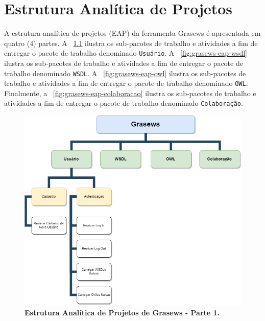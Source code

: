 \chapter{Estrutura Analítica de Projetos}\label{apendice-eap}

A estrutura analítica de projetos (EAP) da ferramenta Grasews é apresentada em quatro (4) partes. A \figurename~\ref{fig:grasews-eap-usuario} ilustra os sub-pacotes de trabalho e atividades a fim de entregar o pacote de trabalho denominado \texttt{Usuário}. A \figurename~\ref{fig:grasews-eap-wsdl} ilustra os sub-pacotes de trabalho e atividades a fim de entregar o pacote de trabalho denominado \texttt{WSDL}. A \figurename~\ref{fig:grasews-eap-owl} ilustra os sub-pacotes de trabalho e atividades a fim de entregar o pacote de trabalho denominado \texttt{OWL}. Finalmente, a \figurename~\ref{fig:grasews-eap-colaboracao} ilustra os sub-pacotes de trabalho e atividades a fim de entregar o pacote de trabalho denominado \texttt{Colaboração}.

    \begin{figure}[h]
            \includegraphics[scale=0.5]{9-pos-textuais/apendices/imagens/grasews-eap-usuario.png}
        \centering
        \caption[Estrutura Analítica de Projetos de Grasews - Parte 1]{\textbf{Estrutura Analítica de Projetos de Grasews - Parte 1.}}
        \label{fig:grasews-eap-usuario}
    \end{figure}

